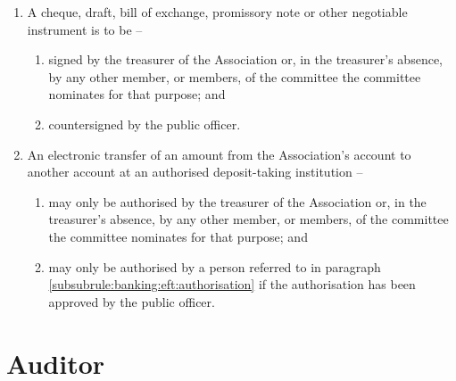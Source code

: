 \documentclass[a4paper,11pt]{article}
\begin{document}
\begin{enumerate}
	\item A cheque, draft, bill of exchange, promissory note or other negotiable instrument is to be --
	\begin{enumerate}
		\item signed by the treasurer of the Association or, in the treasurer's absence, by any other member, or members, of the committee the committee nominates for that purpose; and
		\item countersigned by the public officer.
	\end{enumerate}
	
	\item \label{subrule:banking:eft} An electronic transfer of an amount from the Association's account to another account at an authorised deposit-taking institution --
	\begin{enumerate}
		\item \label{subsubrule:banking:eft:authorisation} may only be authorised by the treasurer of the Association or, in the treasurer's absence, by any other member, or members, of the committee the committee nominates for that purpose; and
		\item may only be authorised by a person referred to in paragraph \ref{subsubrule:banking:eft:authorisation} if the authorisation has been approved by the public officer.
	\end{enumerate}
\end{enumerate}

\section{Auditor}
\label{rule:auditor}
\end{document}
